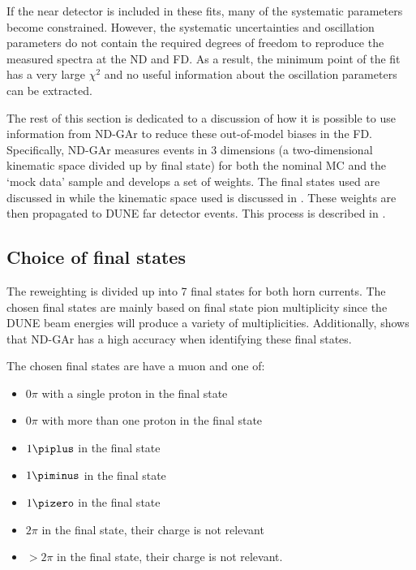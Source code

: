 If the near detector is included in these fits, many of the systematic parameters become constrained. 
However, the systematic uncertainties and oscillation parameters do not contain the required degrees of freedom to reproduce the measured spectra at the ND and FD. 
As a result, the minimum point of the fit has a very large $\chi^{2}$ and no useful information about the oscillation parameters can be extracted.

The rest of this section is dedicated to a discussion of how it is possible to use information from ND-GAr to reduce these out-of-model biases in the FD.
Specifically, ND-GAr measures events in 3 dimensions (a two-dimensional kinematic space divided up by final state) for both the nominal MC and the `mock data' sample and develops a set of weights.
The final states used are discussed in  while the kinematic space used is discussed in .
These weights are then propagated to DUNE far detector events. 
This process is described in .

\subsection{Choice of final states}
\label{sec:dune_ndrwt:rwt:states}

The reweighting is divided up into 7 final states for both horn currents.
The chosen final states are mainly based on final state pion multiplicity since the DUNE beam energies will produce a variety of multiplicities.
Additionally,  shows that ND-GAr has a high accuracy when identifying these final states.

The chosen final states are have a muon and one of:
\begin{itemize}
	\item $0\pi$ with a single proton in the final state
	\item $0\pi$ with more than one proton in the final state
	\item $1\piplus$ in the final state
	\item $1\piminus$ in the final state
	\item $1\pizero$ in the final state
	\item $2\pi$ in the final state, their charge is not relevant
	\item $>2\pi$ in the final state, their charge is not relevant.
\end{itemize}

